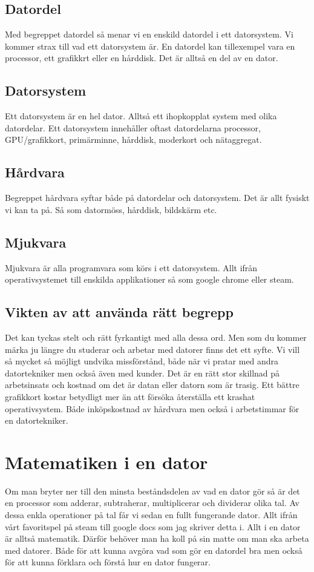 \documentclass[12pt, letterpaper]{report}
\begin{document}
\section{Datordel}
Med begreppet datordel så menar vi en enskild datordel i ett datorsystem. Vi kommer strax till vad ett datorsystem är. En datordel kan tillexempel vara en processor, ett grafikkrt eller en hårddisk. Det är alltså en del av en dator.

\section{Datorsystem}
Ett datorsystem är en hel dator. Alltså ett ihopkopplat system med olika datordelar. Ett datorsystem innehåller oftast datordelarna processor,\\ GPU/grafikkort, primärminne, hårddisk, moderkort och nätaggregat.

\section{Hårdvara}
Begreppet hårdvara syftar både på datordelar och datorsystem. Det är allt fysiskt vi kan ta på. Så som datormöss, hårddisk, bildskärm etc.

\section{Mjukvara}
Mjukvara är alla programvara som körs i ett datorsystem. Allt ifrån operativsystemet till enskilda applikationer så som google chrome eller steam.

\section{Vikten av att använda rätt begrepp}
Det kan tyckas stelt och rätt fyrkantigt med alla dessa ord. Men som du kommer märka ju längre du studerar och arbetar med datorer finns det ett syfte. Vi vill så mycket så möjligt undvika missförstånd, både när vi pratar med andra datortekniker men också även med kunder. Det är en rätt stor skillnad på arbetsinsats och kostnad om det är datan eller datorn som är trasig. Ett bättre grafikkort kostar betydligt mer än att försöka återställa ett krashat operativsystem. Både inköpskostnad av hårdvara men också i arbetstimmar för en datortekniker. 

\chapter{Matematiken i en dator}
Om man bryter ner till den minsta beståndsdelen av vad en dator gör så är det en processor som adderar, subtraherar, multiplicerar och dividerar olika tal. Av dessa enkla operationer på tal får vi sedan en fullt fungerande dator. Allt ifrån vårt favoritspel på steam till google docs som jag skriver detta i. Allt i en dator är alltså matematik. Därför behöver man ha koll på sin matte om man ska arbeta med datorer. Både för att kunna avgöra vad som gör en datordel bra men också för att kunna förklara och förstå hur en dator fungerar. 
\end{document}
